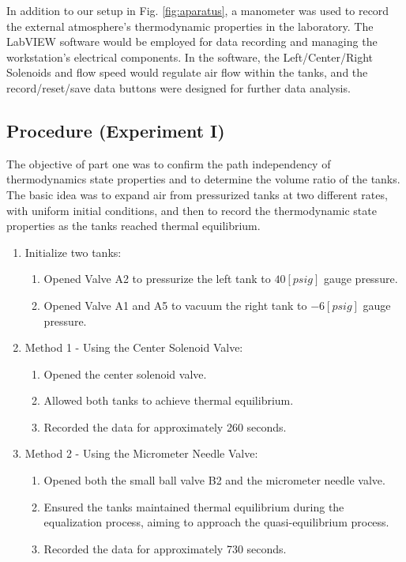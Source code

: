 \documentclass[12pt]{article}
\begin{document}
In addition to our setup in Fig. \ref{fig:aparatus}, a manometer was used to record the external atmosphere’s thermodynamic properties in the laboratory. The LabVIEW software would be employed for data recording and managing the workstation's electrical components. In the software, the Left/Center/Right Solenoids and flow speed would regulate air flow within the tanks, and the record/reset/save data buttons were designed for further data analysis. 

\subsection*{Procedure (Experiment I)}
The objective of part one was to confirm the path independency of thermodynamics state properties and to determine the volume ratio of the tanks. The basic idea was to expand air from pressurized tanks at two different rates, with uniform initial conditions, and then to record the thermodynamic state properties as the tanks reached thermal equilibrium.
\begin{enumerate}
    \item Initialize two tanks: 
    \begin{enumerate}
        \item Opened Valve A2 to pressurize the left tank to $40[psig]$ gauge pressure.
        \item Opened Valve A1 and A5 to vacuum the right tank to $-6[psig]$ gauge pressure.
    \end{enumerate}
    \item Method 1 - Using the Center Solenoid Valve: 
    \begin{enumerate}
        \item Opened the center solenoid valve.
        \item Allowed both tanks to achieve thermal equilibrium.
        \item Recorded the data for approximately 260 seconds.
    \end{enumerate}
    \item Method 2 - Using the Micrometer Needle Valve: 
    \begin{enumerate}
        \item Opened both the small ball valve B2 and the micrometer needle valve.
        \item Ensured the tanks maintained thermal equilibrium during the equalization process, aiming to approach the quasi-equilibrium process.
        \item Recorded the data for approximately 730 seconds.


    \end{enumerate}
\end{enumerate}
\end{document}
